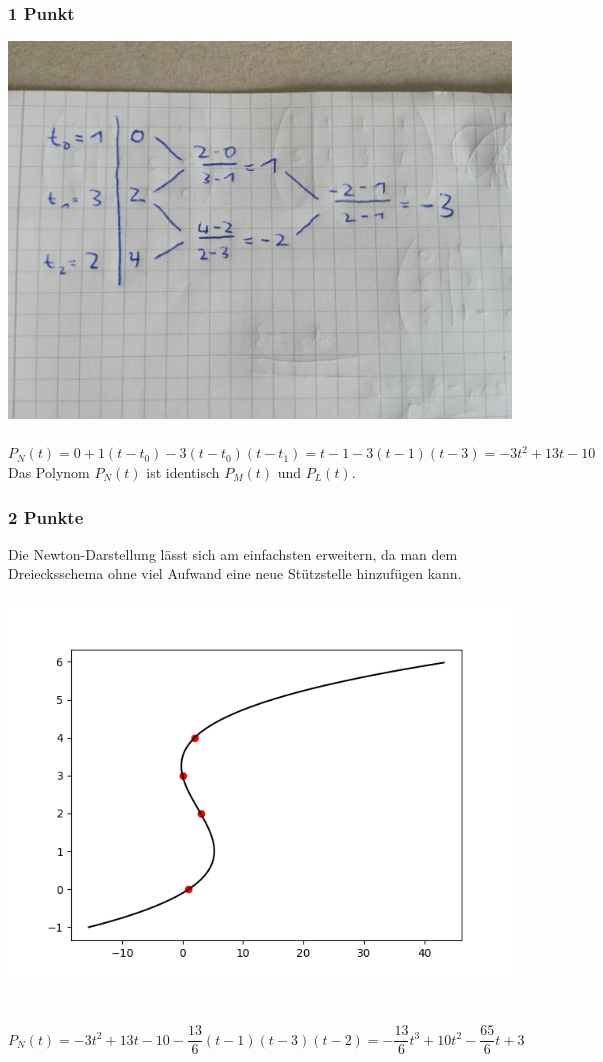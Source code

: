 \subsubsection{1 Punkt}
\includegraphics[scale=0.3]{1c}
\\
\\
$P_{N}(t) = 0 + 1(t - t_{0}) - 3(t - t_{0})(t - t_{1}) = t - 1 - 3(t - 1)(t - 3) = -3t^{2} + 13t - 10$\\
Das Polynom $P_{N}(t)$ ist identisch $P_{M}(t)$ und $P_{L}(t)$.
\subsubsection{2 Punkte}
Die Newton-Darstellung lässt sich am einfachsten erweitern, da man dem Dreiecksschema ohne viel Aufwand eine neue Stützstelle hinzufügen kann. \\
\\
\includegraphics[scale=0.3]{1d}\\
\\
\\
$P_{N}(t) = -3t^{2} + 13t - 10 - \dfrac{13}{6}(t - 1)(t - 3)(t-2) = -\dfrac{13}{6}t^{3} + 10t^{2} - \dfrac{65}{6}t + 3$
